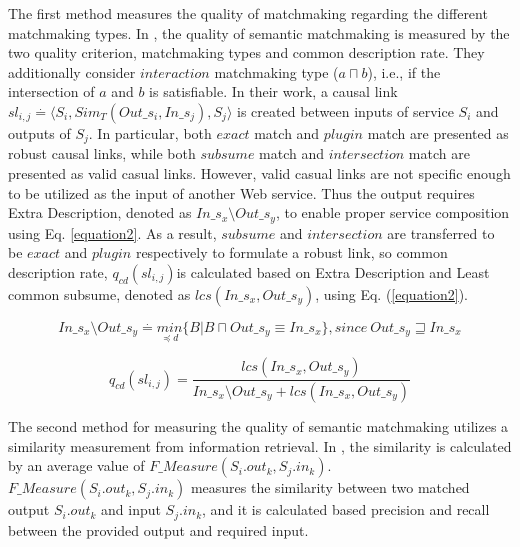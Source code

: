 The first method measures the quality of matchmaking regarding the different matchmaking types. In \cite{lecue2007making}, the quality of semantic matchmaking is measured by the two quality criterion, matchmaking types and common description rate. They additionally consider $interaction$ matchmaking type ($a \sqcap b$), i.e., if the intersection of $a$ and $b$ is satisfiable. In their work, a causal link \begin{math} sl_{i,j} \stackrel{.}{=} \langle S_i, Sim_{T}(Out\_s_i,In\_s_j),S_j  \rangle \end{math} is created between inputs of service $S_i$ and outputs of $S_j$. In particular, both $exact$ match and $plugin$ match are presented as robust causal links, while both $subsume$ match and $intersection$ match are presented as valid casual links. However, valid casual links are not specific enough to be utilized as the input of another Web service. Thus the output requires Extra Description, denoted as \begin{math} In\_s_x \setminus Out\_s_y \end{math}, to enable proper service composition using Eq. \ref{equation2}. As a result, $subsume$ and $intersection$ are transferred to be $exact$ and $plugin$ respectively to formulate a robust link, so common description rate, \begin{math} q_{cd}(sl_{i,j}) \end{math}is calculated based on Extra Description and Least common subsume, denoted as \begin{math} lcs (In\_s_x, Out\_s_y) \end{math}, using Eq. (\ref{equation2}).

\begin{equation}
In\_s_x \setminus Out\_s_y \stackrel{.}{=} \underset {\preceq d}{min} \{ B|B\sqcap  Out\_s_y \equiv In\_s_x  \} , since \  Out\_s_y \sqsupseteq In\_s_x
 \label{equation2}
\end{equation}


\begin{equation}
q_{cd}(sl_{i,j}) = \frac{lcs (In\_s_x, Out\_s_y)} {In\_s_x \setminus Out\_s_y + lcs (In\_s_x, Out\_s_y)}
 \label{equation3}
\end{equation}

The second method for measuring the quality of semantic matchmaking utilizes a similarity measurement from information retrieval. In \cite{pop2009immune}, the similarity is calculated by an average value of $F\_Measure(S_i.out_k, S_j.in_k)$. $F\_Measure(S_i.out_k, S_j.in_k)$ measures the similarity between  two matched output $S_i.out_k$ and input $S_j.in_k$, and it is calculated based precision and recall between the provided output and required input.


